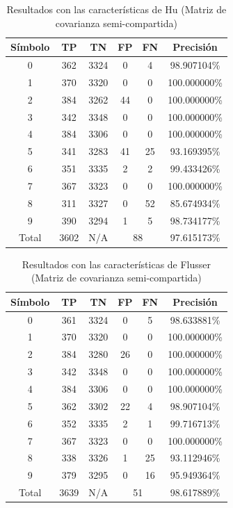 \documentclass[a4paper, 11pt, oneside]{report}
\begin{document}
\begin{table}
\centering
\begin{tabular}{|c|c|c|c|c|c|}
	\hline
	Símbolo & TP & TN & FP & FN & Precisión \\ 
	\hline
	0 & 362 & 3324 & 0 & 4 & 98.907104\% \\ 
	1 & 370 & 3320 & 0 & 0 & 100.000000\% \\ 
	2 & 384 & 3262 & 44 & 0 & 100.000000\% \\ 
	3 & 342 & 3348 & 0 & 0 & 100.000000\% \\ 
	4 & 384 & 3306 & 0 & 0 & 100.000000\% \\ 
	5 & 341 & 3283 & 41 & 25 & 93.169395\% \\ 
	6 & 351 & 3335 & 2 & 2 & 99.433426\% \\ 
	7 & 367 & 3323 & 0 & 0 & 100.000000\% \\ 
	8 & 311 & 3327 & 0 & 52 & 85.674934\% \\ 
	9 & 390 & 3294 & 1 & 5 & 98.734177\% \\ 
	\hline
	Total & 3602 & N/A & \multicolumn{2}{|c|}{88} & 97.615173\% \\
	\hline
\end{tabular}
\caption{Resultados con las características de Hu (Matriz de covarianza semi-compartida)}
\label{tb:numHuShared}
\end{table}

\begin{table}
\centering
\begin{tabular}{|c|c|c|c|c|c|}
	\hline
	Símbolo & TP & TN & FP & FN & Precisión \\ 
	\hline
	0 & 361 & 3324 & 0 & 5 & 98.633881\% \\ 
	1 & 370 & 3320 & 0 & 0 & 100.000000\% \\ 
	2 & 384 & 3280 & 26 & 0 & 100.000000\% \\ 
	3 & 342 & 3348 & 0 & 0 & 100.000000\% \\ 
	4 & 384 & 3306 & 0 & 0 & 100.000000\% \\ 
	5 & 362 & 3302 & 22 & 4 & 98.907104\% \\ 
	6 & 352 & 3335 & 2 & 1 & 99.716713\% \\ 
	7 & 367 & 3323 & 0 & 0 & 100.000000\% \\ 
	8 & 338 & 3326 & 1 & 25 & 93.112946\% \\ 
	9 & 379 & 3295 & 0 & 16 & 95.949364\% \\ 
	\hline
	Total & 3639 & N/A & \multicolumn{2}{|c|}{51} & 98.617889\% \\
	\hline
\end{tabular}
\caption{Resultados con las características de Flusser (Matriz de covarianza semi-compartida)}
\label{tb:numFlShared}
\end{table}
\end{document}
